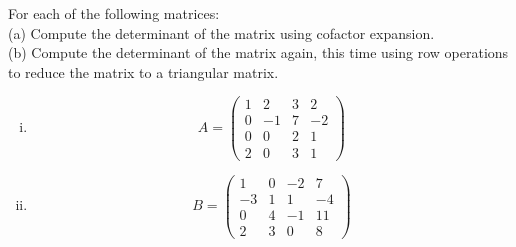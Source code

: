 \begin{question}

\normalfont
For each of the following matrices: \\
\noindent (a) Compute the determinant of the matrix using cofactor expansion. \\
\noindent (b) Compute the determinant of the matrix again, this time using row operations to reduce the matrix to a triangular matrix. \\
\begin{enumerate}[(i)]
\item
\[
A= \begin{pmatrix}
			1 & 2 & 3 & 2\\
			0 & -1 & 7 & -2\\
			0 & 0 & 2 & 1\\
			2 & 0 & 3 & 1	
		\end{pmatrix}
\]
\item
\[
B= \begin{pmatrix}
			1 & 0 & -2 & 7\\
			-3 & 1 & 1 & -4\\
			0 & 4 & -1 & 11\\
			2 & 3 & 0 & 8	
		\end{pmatrix}
\]

\end{enumerate}
\end{question}
